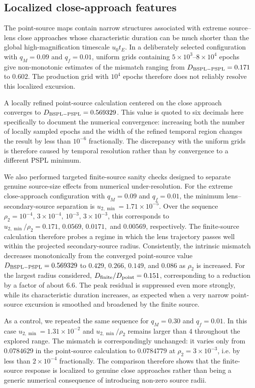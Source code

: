 \documentclass{article}
\begin{document}
\subsection{Localized close-approach features}
\label{app:close_approach}

The point-source maps contain narrow structures associated with extreme
source--lens close approaches whose characteristic duration can be much
shorter than the global high-magnification timescale $u_0t_E$. In a
deliberately selected configuration with $q_M=0.09$ and $q_f=0.01$,
uniform grids containing $5\times10^3$--$8\times10^4$ epochs give
non-monotonic estimates of the mismatch ranging from
$D_{\rm BSPL-PSPL}=0.171$ to $0.602$. The production grid with
$10^4$ epochs therefore does not reliably resolve this localized
excursion.

A locally refined point-source calculation centered on the close
approach converges to $D_{\rm BSPL-PSPL}=0.569329$. This value is quoted
to six decimals here specifically to document the numerical convergence:
increasing both the number of locally sampled epochs and the width of
the refined temporal region changes the result by less than $10^{-6}$
fractionally. The discrepancy with the uniform grids is therefore caused
by temporal resolution rather than by convergence to a different PSPL
minimum.

We also performed targeted finite-source sanity checks designed to
separate genuine source-size effects from numerical under-resolution.
For the extreme close-approach configuration with $q_M=0.09$ and
$q_f=0.01$, the minimum lens--secondary-source separation is
$u_{2,\min}=1.71\times10^{-5}$. Over the sequence
$\rho_2=10^{-4},\,3\times10^{-4},\,10^{-3},\,3\times10^{-3}$, this
corresponds to $u_{2,\min}/\rho_2=0.171,\,0.0569,\,0.0171,$ and
$0.00569$, respectively. The finite-source calculation therefore probes
a regime in which the lens trajectory passes well within the projected
secondary-source radius. Consistently, the intrinsic mismatch decreases
monotonically from the converged point-source value
$D_{\rm BSPL-PSPL}=0.569329$ to $0.429$, $0.266$, $0.149$, and $0.086$
as $\rho_2$ is increased. For the largest radius considered,
$D_{\rm finite}/D_{\rm point}=0.151$, corresponding to a reduction by a
factor of about $6.6$. The peak residual is suppressed even more strongly,
while its characteristic duration increases, as expected when a very
narrow point-source excursion is smoothed and broadened by the finite
source.

As a control, we repeated the same sequence for $q_M=0.30$ and
$q_f=0.01$. In this case $u_{2,\min}=1.31\times10^{-2}$ and
$u_{2,\min}/\rho_2$ remains larger than $4$ throughout the explored
range. The mismatch is correspondingly unchanged: it varies only from
$0.0784629$ in the point-source calculation to $0.0784779$ at
$\rho_2=3\times10^{-3}$, i.e. by less than $2\times10^{-4}$
fractionally. The comparison therefore shows that the finite-source
response is localized to genuine close approaches rather than being a
generic numerical consequence of introducing non-zero source radii.
\end{document}
